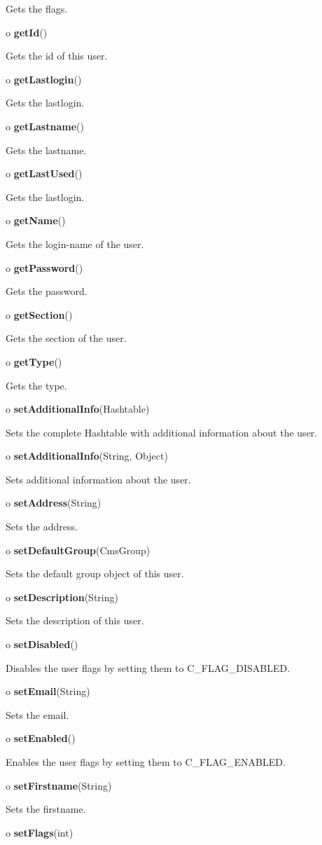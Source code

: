 \begin{description}
Gets the flags.  
\item o {\bf getId}()  

Gets the id of this user.  
\item o {\bf getLastlogin}()  

Gets the lastlogin.  
\item o {\bf getLastname}()  

Gets the lastname.  
\item o {\bf getLastUsed}()  

Gets the lastlogin.  
\item o {\bf getName}()  

Gets the login-name of the user.  
\item o {\bf getPassword}()  

Gets the password.  
\item o {\bf getSection}()  

Gets the section of the user.  
\item o {\bf getType}()  

Gets the type.  
\item o {\bf setAdditionalInfo}(Hashtable)  

Sets the complete Hashtable with additional information about the user.  
\item o {\bf setAdditionalInfo}(String, Object)  

Sets additional information about the user.  
\item o {\bf setAddress}(String)  

Sets the address.  
\item o {\bf setDefaultGroup}(CmsGroup)  

Sets the default group object of this user.  
\item o {\bf setDescription}(String)  

Sets the description of this user.  
\item o {\bf setDisabled}()  

Disables the user flags by setting them to C\_FLAG\_DISABLED.  
\item o {\bf setEmail}(String)  

Sets the email.  
\item o {\bf setEnabled}()  

Enables the user flags by setting them to C\_FLAG\_ENABLED.  
\item o {\bf setFirstname}(String)  

Sets the firstname.  
\item o {\bf setFlags}(int)  


\end{description}
